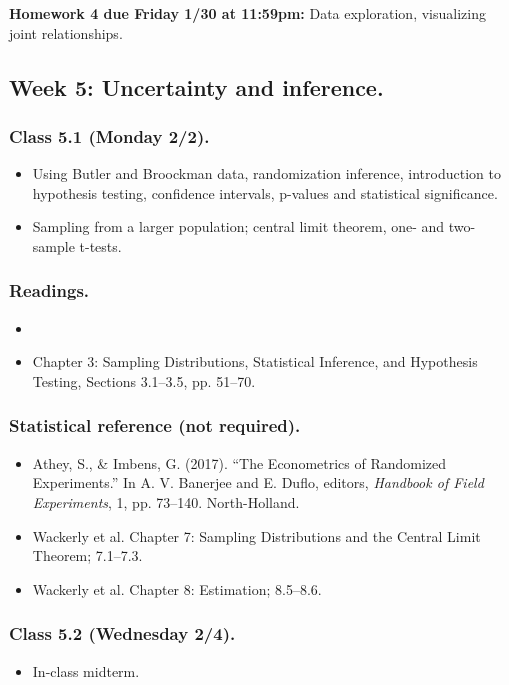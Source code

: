 \documentclass[letterpaper, 12pt, parskip=full,DIV=10]{scrartcl}
\begin{document}
\textbf{Homework 4 due Friday 1/30 at 11:59pm:}
Data exploration, visualizing joint relationships.

\subsection*{Week 5: Uncertainty and inference.}
\subsubsection*{Class 5.1 (Monday 2/2).}
\begin{itemize}
\item Using Butler and Broockman data, randomization inference, introduction to hypothesis testing, confidence intervals, p-values and statistical significance.
\item Sampling from a larger population; central limit theorem, one- and two-sample t-tests.
\end{itemize}

\subsubsection*{Readings.}
\begin{itemize}
\item {}
\item {} Chapter 3: Sampling Distributions, Statistical Inference, and Hypothesis Testing, Sections 3.1--3.5, pp. 51--70.
\end{itemize}

\subsubsection*{Statistical reference (not required).}
\begin{itemize}
\item Athey, S., \& Imbens, G. (2017). ``The Econometrics of Randomized Experiments.'' In A. V. Banerjee and E. Duflo, editors, \textit{Handbook of Field Experiments}, 1, pp. 73--140. North-Holland.
\item Wackerly et al. Chapter 7: Sampling Distributions and the Central Limit Theorem; 7.1--7.3.
\item Wackerly et al. Chapter 8: Estimation; 8.5--8.6.
\end{itemize}

\subsubsection*{Class 5.2 (Wednesday 2/4).}
\begin{itemize}
\item In-class midterm.
\end{itemize}
\end{document}
